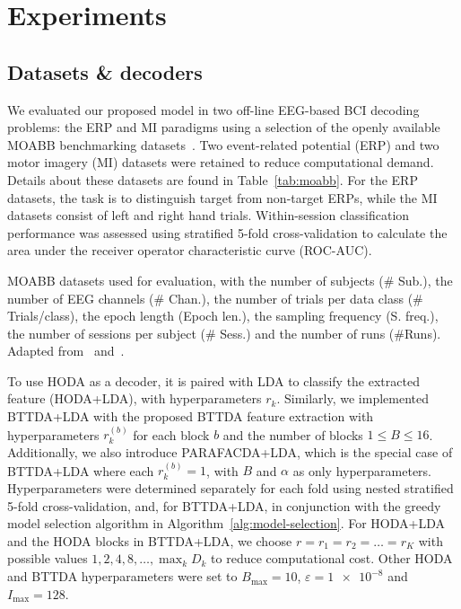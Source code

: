 \documentclass[twocolumn]{article}
\begin{document}
\section{Experiments}
\subsection{Datasets \& decoders}
We evaluated our proposed model in two off-line EEG-based BCI decoding problems: the ERP and MI paradigms using a selection of the openly available MOABB benchmarking
datasets~\cite{Aristimunha2023}.
Two event-related potential (ERP) and two motor imagery (MI) datasets were
retained to reduce computational
demand.
Details about these datasets are found in Table~\ref{tab:moabb}.
For the ERP datasets, the task is to distinguish target from non-target ERPs,
while the MI datasets consist of left and right hand trials.
Within-session classification performance was assessed using stratified 5-fold
cross-validation to calculate the area under the receiver operator
characteristic curve (ROC-AUC).
\begin{table}[t]
	\centering
	\footnotesize
	
	\caption{MOABB datasets used for evaluation, with the number of
		subjects (\# Sub.), the number of EEG channels (\# Chan.), the number of trials
		per data class (\# Trials/class), the epoch length (Epoch len.), the sampling
		frequency (S. freq.), the number of sessions per subject (\# Sess.) and the
		number of runs (\#Runs).
		Adapted from~\cite{Aristimunha2023} and~\cite{Chevallier2024}.}
	\label{tab:moabb}
\end{table}

To use \textsc{HODA} as a decoder, it is paired with LDA to classify the
extracted feature (HODA+LDA), with hyperparameters $r_k$.
Similarly, we implemented BTTDA+LDA with the proposed \textsc{BTTDA} feature
extraction with hyperparameters $r_k^{(b)}$ for each block $b$ and the number of blocks
$1\leq B\leq16$.
Additionally, we also introduce PARAFACDA+LDA, which is the special case of
BTTDA+LDA where each $r_k^{(b)}=1$, with $B$ and $\alpha$ as only hyperparameters.
Hyperparameters were determined separately for each fold using nested
stratified 5-fold cross-validation, and, for BTTDA+LDA, in conjunction with the
greedy model selection algorithm in Algorithm~\ref{alg:model-selection}.
For HODA+LDA and the \textsc{HODA} blocks in BTTDA+LDA, we choose
$r=r_1=r_2=\ldots=r_K$ with possible values
$\textstyle{1,2,4,8,\ldots,\max_kD_k}$
to reduce computational cost.
Other \textsc{HODA} and \textsc{BTTDA} hyperparameters were set to
$B_\text{max}=10$, $\varepsilon=\num{1e-8}$ and $I_\text{max}=128$.
\end{document}
